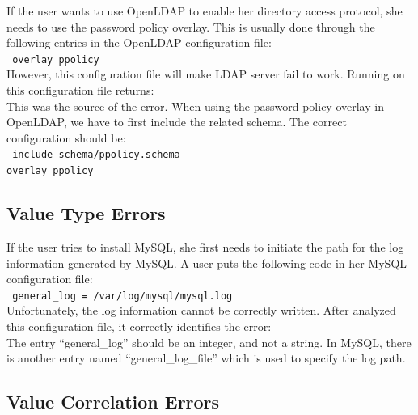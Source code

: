 If the user wants to use OpenLDAP to enable her directory access
protocol, she needs to use the password policy overlay. This is usually
done through the following entries in the OpenLDAP configuration file:\\
\texttt{
 \hspace*{3em}overlay ppolicy\\}
However, this configuration file will make LDAP server fail to work.
Running \app on this configuration file returns:
\\
This was the source of the error. When using the password policy overlay
in OpenLDAP, we have to first include the related schema. The correct configuration should be:\\
\texttt{
 \hspace*{3em}include schema/ppolicy.schema\\
 \hspace*{3em}overlay ppolicy\\
}

\subsection{Value Type Errors}

If the user tries to install MySQL, she first needs to 
initiate the path for the
log information generated by MySQL. A user puts the following code in 
her MySQL configuration file:\\
\texttt{
 \hspace*{3em}general\_log = /var/log/mysql/mysql.log\\}
Unfortunately, the log information cannot be correctly written.
After \app analyzed this configuration file, it correctly identifies the error:
\\
The entry ``general\_log'' should be an integer, 
and not a string. In MySQL, there is another entry named
``general\_log\_file'' which is used to specify the log path.  

\subsection{Value Correlation Errors}

